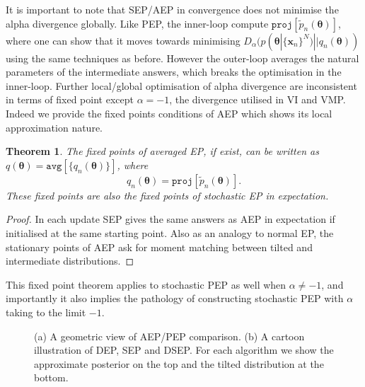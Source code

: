 \documentclass{article} %
\newtheorem{theorem}{Theorem}
\begin{document}
It is important to note that SEP/AEP in convergence does not minimise the alpha divergence globally. Like PEP, the inner-loop compute $\mathtt{proj}[\tilde{p}_n(\bm{\theta})]$, where one can show that it moves towards minimising $D_{\alpha}(p(\bm{\theta} | \{\bm{x}_n\}^N) || q_n(\bm{\theta}))$ using the same techniques as before. However the outer-loop averages the natural parameters of the intermediate answers, which breaks the optimisation in the inner-loop. Further local/global optimisation of alpha divergence are inconsistent in terms of fixed point except $\alpha = -1$, the divergence utilised in VI and VMP. Indeed we provide the fixed points conditions of AEP which shows its local approximation nature.
%
\begin{theorem}
The fixed points of averaged EP, if exist, can be written as $q(\bm{\theta}) = \mathtt{avg}[\{q_n(\bm{\theta})\}]$, where
\begin{equation}
q_n(\bm{\theta}) = \mathtt{proj}[\tilde{p}_n(\bm{\theta})].
\label{eq:mm}
\end{equation}
These fixed points are also the fixed points of stochastic EP in expectation. 
\end{theorem}
\begin{proof}
In each update SEP gives the same answers as AEP in expectation if initialised at the same starting point. Also as an analogy to normal EP, the stationary points of AEP ask for moment matching between tilted and intermediate distributions. 
\end{proof}
%
This fixed point theorem applies to stochastic PEP as well when $\alpha \neq -1$, and importantly it also implies the pathology of constructing stochastic PEP with $\alpha$ taking to the limit $-1$. 

%
\begin{figure}
\centering
\def\svgwidth{0.35\linewidth}
\subfigure[\label{fig:aep_vs_pep}]{
}
%
\hspace{0.5in}
%
\def\svgwidth{0.4\linewidth}
\subfigure[\label{fig:dep_sep_dsep}]{
}

\caption{(a) A geometric view of AEP/PEP comparison. (b) A cartoon illustration of DEP, SEP and DSEP. For each algorithm we show the approximate posterior on the top and the tilted distribution at the bottom.}

\end{figure}
\end{document}

